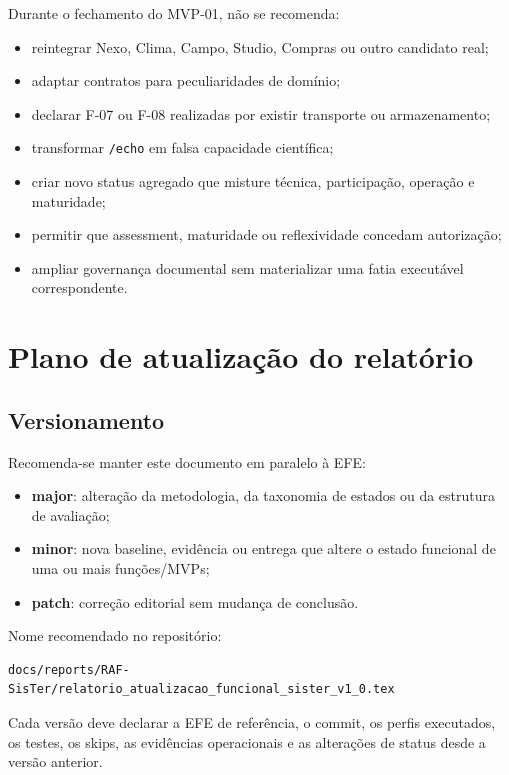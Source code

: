 \documentclass[11pt,a4paper,oneside]{article}
\begin{document}
Durante o fechamento do MVP-01, não se recomenda:

\begin{itemize}
  \item reintegrar Nexo, Clima, Campo, Studio, Compras ou outro candidato real;
  \item adaptar contratos para peculiaridades de domínio;
  \item declarar F-07 ou F-08 realizadas por existir transporte ou armazenamento;
  \item transformar \texttt{/echo} em falsa capacidade científica;
  \item criar novo status agregado que misture técnica, participação, operação e maturidade;
  \item permitir que assessment, maturidade ou reflexividade concedam autorização;
  \item ampliar governança documental sem materializar uma fatia executável correspondente.
\end{itemize}

\section{Plano de atualização do relatório}

\subsection{Versionamento}

Recomenda-se manter este documento em paralelo à EFE:

\begin{itemize}
  \item \textbf{major}: alteração da metodologia, da taxonomia de estados ou da estrutura de avaliação;
  \item \textbf{minor}: nova baseline, evidência ou entrega que altere o estado funcional de uma ou mais funções/MVPs;
  \item \textbf{patch}: correção editorial sem mudança de conclusão.
\end{itemize}

Nome recomendado no repositório:

\begin{lstlisting}
docs/reports/RAF-SisTer/relatorio_atualizacao_funcional_sister_v1_0.tex
\end{lstlisting}

Cada versão deve declarar a EFE de referência, o commit, os perfis executados, os testes, os skips, as evidências operacionais e as alterações de status desde a versão anterior.
\end{document}

